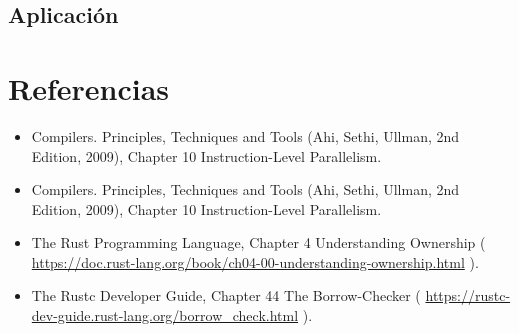 \documentclass[12pt, a4paper]{article}
\begin{document}
\subsection{Aplicación}

\section{Referencias}

\begin{itemize}
\item Compilers. Principles, Techniques and Tools (Ahi, Sethi, Ullman, 2nd Edition, 2009), Chapter 10 Instruction-Level Parallelism.
\item Compilers. Principles, Techniques and Tools (Ahi, Sethi, Ullman, 2nd Edition, 2009), Chapter 10 Instruction-Level Parallelism.
\item The Rust Programming Language, Chapter 4 Understanding Ownership 
      ( \url{https://doc.rust-lang.org/book/ch04-00-understanding-ownership.html} ). 
\item The Rustc Developer Guide, Chapter 44 The Borrow-Checker 
      ( \url{https://rustc-dev-guide.rust-lang.org/borrow_check.html} ). 
\end{itemize}
\end{document}
